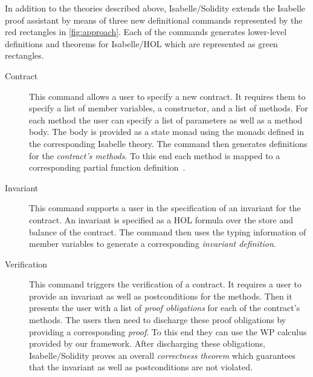 \documentclass[a4paper,UKenglish,cleveref, autoref, thm-restate]{oasics-v2021}
\begin{document}
\noindent
In addition to the theories described above, Isabelle/Solidity extends the Isabelle proof assistant by means of three new definitional commands represented by the {\color{red}red rectangles} in \autoref{fig:approach}.
Each of the commands generates lower-level definitions and theorems for Isabelle/HOL which are represented as {\color{green}green rectangles}.
\begin{description}
    \item[Contract]
    This command allows a user to specify a new contract.
    It requires them to specify a list of member variables, a constructor, and a list of methods.
    For each method the user can specify a list of parameters as well as a method body.
    The body is provided as a state monad using the monads defined in the corresponding Isabelle theory.
    The command then generates definitions for the \emph{contract's methods}.
    To this end each method is mapped to a corresponding partial function definition~\cite{Krauss2010}.
    \item[Invariant]
    This command supports a user in the specification of an invariant for the contract.
    An invariant is specified as a HOL formula over the store and balance of the contract.
    The command then uses the typing information of member variables to generate a corresponding \emph{invariant definition}.
    \item[Verification]
    This command triggers the verification of a contract.
    It requires a user to provide an invariant as well as postconditions for the methods.
    Then it presents the user with a list of \emph{proof obligations} for each of the contract's methods.
    The users then need to discharge these proof obligations by providing a corresponding \emph{proof}.
    To this end they can use the WP calculus provided by our framework.
    After discharging these obligations, Isabelle/Solidity proves an overall \emph{correctness theorem} which guarantees that the invariant as well as postconditions are not violated.
\end{description}
\end{document}
